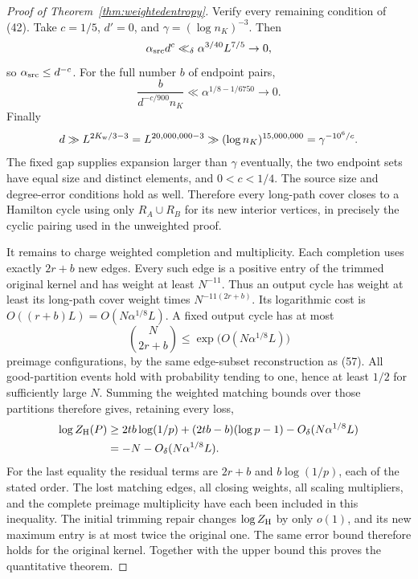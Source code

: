 \begin{proof}[Proof of Theorem~\ref{thm:weightedentropy}]
Verify every remaining condition of (42).
Take \(c=1/5\), \(d'=0\), and
\(\gamma=(\log n_K)^{-3}\).
Then
\[
 \alpha_{\rm src}d^c
 \ll_\delta\alpha^{3/40}L^{7/5}\to0,
\]
so \(\alpha_{\rm src}\leq d^{-c}\).
For the full number \(b\) of endpoint pairs,
\[
 \frac{b}{d^{-c/900}n_K}
 \ll\alpha^{1/8-1/6750}\longrightarrow0.
\]
Finally
\[
 d\gg L^{2K_{\rm w}/3-3}
        =L^{20,000,000-3}
        \gg(\log n_K)^{15,000,000}
        =\gamma^{-10^6/c}.
\]
The fixed gap supplies expansion larger than \(\gamma\)
eventually, the two endpoint sets have equal size and
distinct elements, and \(0<c<1/4\).
The source size and degree-error conditions hold as well.
Therefore every long-path cover closes to a Hamilton cycle
using only \(R_A\cup R_B\) for its new interior vertices,
in precisely the cyclic pairing used in the unweighted proof.

It remains to charge weighted completion and multiplicity.
Each completion uses exactly \(2r+b\) new edges.
Every such edge is a positive entry of the trimmed original
kernel and has weight at least \(N^{-11}\).
Thus an output cycle has weight at least its long-path
cover weight times \(N^{-11(2r+b)}\).
Its logarithmic cost is
\(O((r+b)L)=O(N\alpha^{1/8}L)\).
A fixed output cycle has at most
\[
 \binom N{2r+b}
       \leq\exp\bigl(O(N\alpha^{1/8}L)\bigr)
\]
preimage configurations, by the same edge-subset
reconstruction as (57).
All good-partition events hold with probability tending to
one, hence at least \(1/2\) for sufficiently large \(N\).
Summing the weighted matching bounds over those partitions
therefore gives, retaining every loss,
\[
 \begin{split}
 \log Z_{\rm H}(P)
 &\geq
 2tb\log(1/p)+(2tb-b)(\log p-1)
                          -O_\delta(N\alpha^{1/8}L)\\
 &=-N-O_\delta(N\alpha^{1/8}L).
 \end{split}
\]
For the last equality the residual terms are \(2r+b\) and
\(b\log(1/p)\), each of the stated order.
The lost matching edges, all closing weights, all scaling
multipliers, and the complete preimage multiplicity have
each been included in this inequality.
The initial trimming repair changes \(\log Z_{\rm H}\) by
only \(o(1)\), and its new maximum entry is at most twice the
original one. The same error bound therefore holds for the
original kernel. Together with the upper bound this proves
the quantitative theorem.
\end{proof}

